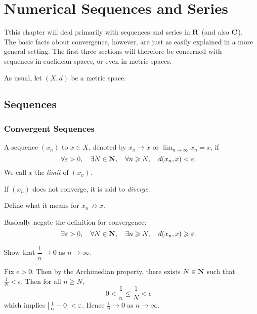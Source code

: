 \chapter{Numerical Sequences and Series}\label{chap:num-seq-series}
Tthis chapter will deal primarily with sequences and series in $\mathbf R$ (and also $\mathbf C$). The basic facts about convergence, however, are just as easily explained in a more general setting. The first three sections will therefore be concerned with sequences in euclidean spaces, or even in metric spaces.

As usual, let $(X,d)$ be a metric space.

\section{Sequences}
\subsection{Convergent Sequences}
\begin{definition}[Convergence]
A sequence $(x_n)$  to $x\in X$, denoted by $x_n\to x$ or $\displaystyle\lim_{n\to\infty}x_n=x$, if
\[\forall\varepsilon>0,\quad\exists N\in\mathbf N,\quad\forall n\geqslant N,\quad d(x_n,x)<\varepsilon.\]
We call $x$ the \emph{limit} of $(x_n)$.

If $(x_n)$ does not converge, it is said to \emph{diverge}.
\end{definition}

\begin{exercise}
Define what it means for $x_n\not\to x$.
\end{exercise}

\begin{solution}
Basically negate the definition for convergence:
\[\exists\varepsilon>0,\quad\forall N\in\mathbf N,\quad\exists n\geqslant N,\quad d(x_n,x)\geqslant\varepsilon.\]
\end{solution}

\begin{exercise}
Show that $\dfrac{1}{n}\to 0$ as $n\to\infty$.
\end{exercise}

\begin{solution}
Fix $\epsilon>0$. Then by the Archimedian property, there exists $N\in\mathbf N$ such that $\frac{1}{N}<\epsilon$. Then for all $n\ge N$,
\[0<\frac{1}{n}\le\frac{1}{N}<\epsilon\]
which implies $\left|\frac{1}{n}-0\right|<\varepsilon$. Hence $\frac{1}{n}\to0$ as $n\to\infty$.
\end{solution}

